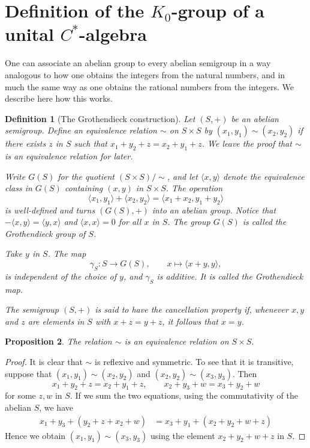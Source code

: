 \documentclass{book}
\newtheorem{definition}{Definition}[section]
\newtheorem{proposition}[definition]{Proposition}
\begin{document}
\section{Definition of the \texorpdfstring{\(K_0\)}{K0}-group of a unital \texorpdfstring{\(C^*\)}{C*}-algebra}
One can associate an abelian group to every abelian semigroup in a way analogous to how one obtains
the integers from the natural numbers, and in much the same way as one obtains the rational numbers from the integers.
We describe here how this works.

\begin{definition}[The Grothendieck construction]
  Let \((S,+)\) be an abelian semigroup. Define an equivalence relation \(\sim\) on \(S\times S\) by \((x_1,y_1)\sim (x_2,y_2)\) 
  if there exists \(z\) in \(S\) such that \(x_1+y_2+z=x_2+y_1+z\). We leave the proof that \(\sim\) is an equivalence relation for later.\par
  Write \(G(S)\) for the quotient \((S\times S)/\sim\), and let \(\langle x,y\rangle\) denote the equivalence class in \(G(S)\) containing \((x,y)\) in \(S\times S\). The operation
  \[
    \langle x_1,y_1\rangle+\langle x_2,y_2\rangle=\langle x_1+x_2,y_1+y_2\rangle
  \]
  is well-defined and turns \((G(S),+)\) into an abelian group.
  Notice that \(-\langle x,y\rangle=\langle y,x\rangle\) and \(\langle x,x\rangle=0\) for all \(x\) in \(S\).
  The group \(G(S)\) is called the \textnormal{Grothendieck group} of \(S\).\par
  Take \(y\) in \(S\). The map
  \[
    \gamma_S:S\rightarrow G(S),\qquad x\mapsto\langle x+y,y\rangle,
  \]
  is independent of the choice of \(y\), and \(\gamma_S\) is additive. It is called the 
  \textnormal{Grothendieck map}.\par
  The semigroup \((S,+)\) is said to have the \textnormal{cancellation property} if, whenever \(x, y\) and \(z\) are elements in \(S\)
  with \(x+z=y+z\), it follows that \(x=y\).
\end{definition}
\begin{proposition}
  The relation \(\sim\) is an equivalence relation on \(S\times S\).
\end{proposition}
\begin{proof}
  It is clear that \(\sim\) is reflexive and symmetric. To see that it is transitive, suppose that \((x_1,y_1)\sim(x_2,y_2)\) and \((x_2,y_2)\sim(x_3,y_3)\). Then
  \[
    x_1+y_2+z=x_2+y_1+z,\qquad x_2+y_3+w=x_3+y_2+w
  \]
  for some \(z, w\) in \(S\). If we sum the two equations, using the commutativity of the abelian \(S\), we have
  \begin{align*}
    x_1+y_3+(y_2+z+x_2+w)&=x_3+y_1+(x_2+y_2+w+z)
  \end{align*}
  Hence we obtain \((x_1,y_1)\sim (x_3,y_3)\) using the element \(x_2+y_2+w+z\) in \(S\).
\end{proof}
\end{document}
